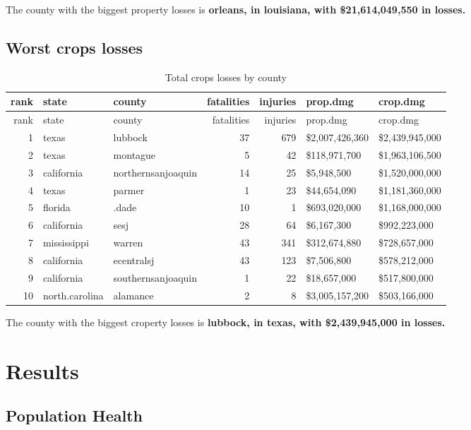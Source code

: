 \documentclass[]{article}
\begin{document}
The county with the biggest property losses is \textbf{orleans, in
louisiana, with \$21,614,049,550 in losses.}

\subsection{Worst crops losses}\label{worst-crops-losses}

\begin{longtable}[]{@{}rllrrll@{}}
\caption{Total crops losses by county}\tabularnewline
\toprule
rank & state & county & fatalities & injuries & prop.dmg &
crop.dmg\tabularnewline
\midrule
\endfirsthead
\toprule
rank & state & county & fatalities & injuries & prop.dmg &
crop.dmg\tabularnewline
\midrule
\endhead
1 & texas & lubbock & 37 & 679 & \$2,007,426,360 &
\$2,439,945,000\tabularnewline
2 & texas & montague & 5 & 42 & \$118,971,700 &
\$1,963,106,500\tabularnewline
3 & california & northernsanjoaquin & 14 & 25 & \$5,948,500 &
\$1,520,000,000\tabularnewline
4 & texas & parmer & 1 & 23 & \$44,654,090 &
\$1,181,360,000\tabularnewline
5 & florida & .dade & 10 & 1 & \$693,020,000 &
\$1,168,000,000\tabularnewline
6 & california & sesj & 28 & 64 & \$6,167,300 &
\$992,223,000\tabularnewline
7 & mississippi & warren & 43 & 341 & \$312,674,880 &
\$728,657,000\tabularnewline
8 & california & ecentralsj & 43 & 123 & \$7,506,800 &
\$578,212,000\tabularnewline
9 & california & southernsanjoaquin & 1 & 22 & \$18,657,000 &
\$517,800,000\tabularnewline
10 & north.carolina & alamance & 2 & 8 & \$3,005,157,200 &
\$503,166,000\tabularnewline
\bottomrule
\end{longtable}

The county with the biggest croperty losses is \textbf{lubbock, in
texas, with \$2,439,945,000 in losses.}

\section{Results}\label{results}

\subsection{Population Health}\label{population-health}
\end{document}
